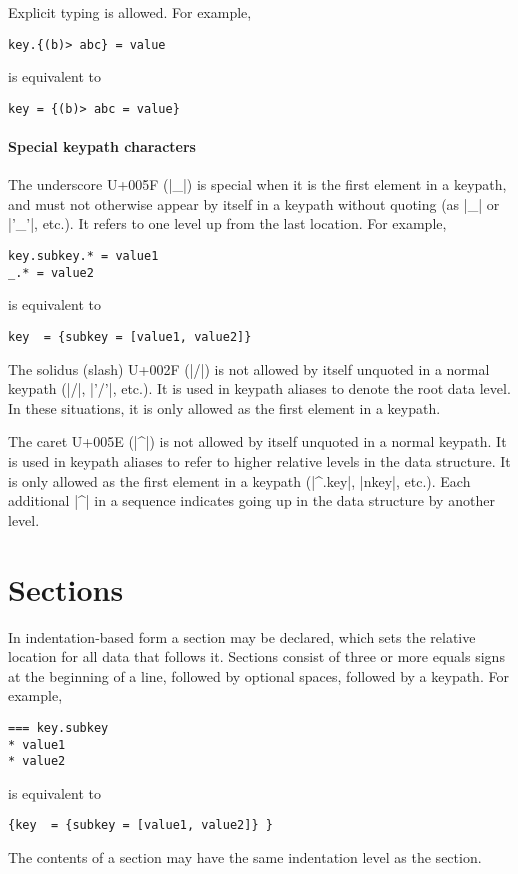 \documentclass[11pt]{article}
\begin{document}
{{Explicit typing is allowed.  For example,
\begin{Verbatim}
key.{(b)> abc} = value
\end{Verbatim}
is equivalent to
\begin{Verbatim}
key = {(b)> abc = value}
\end{Verbatim}


\paragraph{Special keypath characters}

The underscore U+005F (|_|) is special when it is the first element in a keypath, and must not otherwise appear by itself in a keypath without quoting (as |{_}| or |{'_'}|, etc.).  It refers to one level up from the last location.  For example,
\begin{Verbatim}
key.subkey.* = value1
_.* = value2
\end{Verbatim}
is equivalent to
\begin{Verbatim}
key  = {subkey = [value1, value2]}
\end{Verbatim}

The solidus (slash) U+002F (|/|) is not allowed by itself unquoted in a normal keypath (|{/}|, |{'/'}|, etc.).  It is used in keypath aliases to denote the root data level.  In these situations, it is only allowed as the first element in a keypath.

The caret U+005E (|^|) is not allowed by itself unquoted in a normal keypath.  It is used in keypath aliases to refer to higher relative levels in the data structure.  It is only allowed as the first element in a keypath (|^.key|, |^^.key|, etc.).  Each additional |^| in a sequence indicates going up in the data structure by another level.

\section{Sections}

In indentation-based form a section may be declared, which sets the relative location for all data that follows it.  Sections consist of three or more equals signs at the beginning of a line, followed by optional spaces, followed by a keypath.  For example,
\begin{Verbatim}
=== key.subkey
* value1
* value2
\end{Verbatim}
is equivalent to
\begin{Verbatim}
{key  = {subkey = [value1, value2]} }
\end{Verbatim}
The contents of a section may have the same indentation level as the section.

}}
\end{document}
